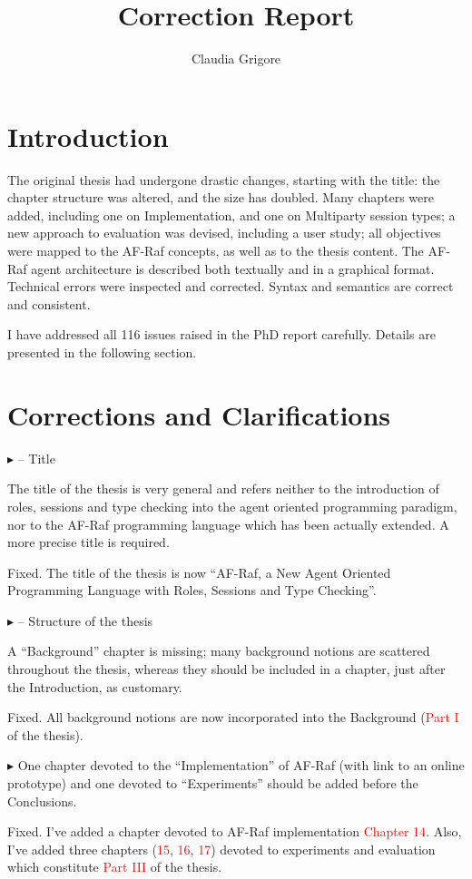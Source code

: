 \documentclass{article}
\title{Correction Report}
\author{Claudia Grigore}
\newcommand*\R[1]{\textcolor{red}{#1}} %
\newenvironment{them}%
  {\bigskip\noindent\begingroup\color{blue}$\blacktriangleright$\enspace}%
  {\endgroup\par}
\begin{document}
\maketitle

\section{Introduction}
The original thesis had undergone drastic changes, starting with the title: the chapter structure was altered, and the size has doubled. Many chapters were added, including one on Implementation, and one on Multiparty session types; a new approach to evaluation was devised, including a user study; all objectives were mapped to the AF-Raf concepts, as well as to the thesis content. The AF-Raf agent architecture is described both textually and in a graphical format. Technical errors were inspected and corrected. Syntax and semantics are correct and consistent.

I have addressed all 116 issues raised in the PhD report carefully.
Details are presented in the following section.

\section{Corrections and Clarifications}

\begin{them}
-- Title

The title of the thesis is very general and refers neither to the introduction
of roles, sessions and type checking into the agent oriented programming
paradigm, nor to the AF-Raf programming language which has been actually
extended. A more precise title is required.
\end{them}
Fixed. The title of the thesis is now ``AF-Raf, a New Agent Oriented Programming
Language with Roles, Sessions and Type Checking''.

\begin{them}
-- Structure of the thesis

A ``Background'' chapter is missing; many background notions are scattered
throughout the thesis, whereas they should be included in a chapter, just after
the Introduction, as customary.
\end{them}
Fixed. All background notions are now incorporated into the Background (\R{Part
I} of the thesis).

\begin{them}
One chapter devoted to the ``Implementation'' of AF-Raf (with link to an online
prototype) and one devoted to ``Experiments'' should be added before the
Conclusions.
\end{them}
Fixed. I've added a chapter devoted to AF-Raf implementation \R{Chapter 14}.
Also, I've added three chapters (\R{15}, \R{16}, \R{17}) devoted to experiments
and evaluation which constitute \R{Part III} of the thesis.
\end{document}
